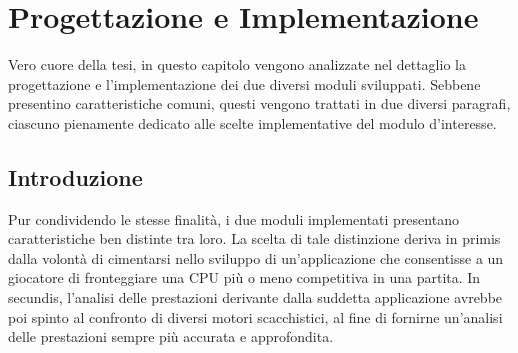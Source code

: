 \chapter{Progettazione e Implementazione} %
%

\begin{citazione}
Vero cuore della tesi, in questo capitolo vengono analizzate nel dettaglio la progettazione e l'implementazione dei due diversi moduli sviluppati. Sebbene presentino caratteristiche comuni, questi vengono trattati in due diversi paragrafi, ciascuno pienamente dedicato alle scelte implementative del modulo d'interesse.
\end{citazione}

\section{Introduzione}
Pur condividendo le stesse finalità, i due moduli implementati presentano caratteristiche ben distinte tra loro. La scelta di tale distinzione deriva in primis dalla volontà di cimentarsi nello sviluppo di un'applicazione che consentisse a un giocatore di fronteggiare una CPU più o meno competitiva in una partita. In secundis, l'analisi delle prestazioni derivante dalla suddetta applicazione avrebbe poi spinto al confronto di diversi motori scacchistici, al fine di fornirne un'analisi delle prestazioni sempre più accurata e approfondita.

